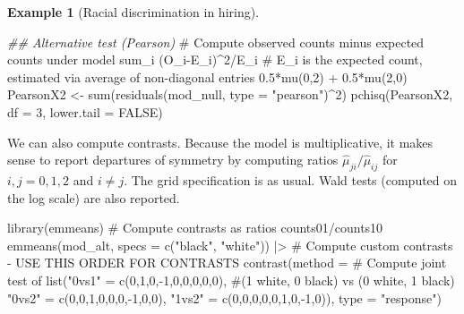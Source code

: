 \documentclass[
  11pt,
  letterpaper,
]{scrbook}
\newenvironment{Shaded}{\begin{snugshade}}{\end{snugshade}}
\newcommand{\AttributeTok}[1]{\textcolor[rgb]{0.40,0.45,0.13}{#1}}
\newcommand{\CommentTok}[1]{\textcolor[rgb]{0.37,0.37,0.37}{#1}}
\newcommand{\ConstantTok}[1]{\textcolor[rgb]{0.56,0.35,0.01}{#1}}
\newcommand{\DecValTok}[1]{\textcolor[rgb]{0.68,0.00,0.00}{#1}}
\newcommand{\DocumentationTok}[1]{\textcolor[rgb]{0.37,0.37,0.37}{\textit{#1}}}
\newcommand{\FunctionTok}[1]{\textcolor[rgb]{0.28,0.35,0.67}{#1}}
\newcommand{\NormalTok}[1]{\textcolor[rgb]{0.00,0.23,0.31}{#1}}
\newcommand{\OtherTok}[1]{\textcolor[rgb]{0.00,0.23,0.31}{#1}}
\newcommand{\SpecialCharTok}[1]{\textcolor[rgb]{0.37,0.37,0.37}{#1}}
\newcommand{\StringTok}[1]{\textcolor[rgb]{0.13,0.47,0.30}{#1}}
\theoremstyle{definition}
\theoremstyle{definition}
\newtheorem{example}{Example}[chapter]
\theoremstyle{remark}
\begin{document}
\begin{example}[Racial discrimination in
hiring]
\begin{Shaded}
\begin{Highlighting}[]
\DocumentationTok{\#\# Alternative test (Pearson)}
\CommentTok{\# Compute observed counts minus expected counts under model sum\_i (O\_i{-}E\_i)\^{}2/E\_i}
\CommentTok{\# E\_i is the expected count, estimated via average of non{-}diagonal entries 0.5*mu(0,2) + 0.5*mu(2,0)}
\NormalTok{PearsonX2 }\OtherTok{\textless{}{-}} \FunctionTok{sum}\NormalTok{(}\FunctionTok{residuals}\NormalTok{(mod\_null, }\AttributeTok{type =} \StringTok{"pearson"}\NormalTok{)}\SpecialCharTok{\^{}}\DecValTok{2}\NormalTok{)}
\FunctionTok{pchisq}\NormalTok{(PearsonX2, }\AttributeTok{df =} \DecValTok{3}\NormalTok{, }\AttributeTok{lower.tail =} \ConstantTok{FALSE}\NormalTok{)}
\end{Highlighting}
\end{Shaded}

We can also compute contrasts. Because the model is multiplicative, it
makes sense to report departures of symmetry by computing ratios
\(\widehat{\mu}_{ji}/\widehat{\mu}_{ij}\) for \(i, j = 0, 1, 2\) and
\(i \neq j\). The grid specification is as usual. Wald tests (computed
on the log scale) are also reported.

\begin{Shaded}
\begin{Highlighting}[]
\FunctionTok{library}\NormalTok{(emmeans)}
\CommentTok{\# Compute contrasts as ratios counts01/counts10}
\FunctionTok{emmeans}\NormalTok{(mod\_alt, }\AttributeTok{specs =} \FunctionTok{c}\NormalTok{(}\StringTok{"black"}\NormalTok{, }\StringTok{"white"}\NormalTok{)) }\SpecialCharTok{|\textgreater{}}
  \CommentTok{\# Compute custom contrasts {-} USE THIS ORDER FOR CONTRASTS}
  \FunctionTok{contrast}\NormalTok{(}\AttributeTok{method =} \CommentTok{\# Compute joint test of}
              \FunctionTok{list}\NormalTok{(}\StringTok{"0vs1"} \OtherTok{=} \FunctionTok{c}\NormalTok{(}\DecValTok{0}\NormalTok{,}\DecValTok{1}\NormalTok{,}\DecValTok{0}\NormalTok{,}\SpecialCharTok{{-}}\DecValTok{1}\NormalTok{,}\DecValTok{0}\NormalTok{,}\DecValTok{0}\NormalTok{,}\DecValTok{0}\NormalTok{,}\DecValTok{0}\NormalTok{,}\DecValTok{0}\NormalTok{), }
                   \CommentTok{\#(1 white, 0 black) vs (0 white, 1 black)}
                   \StringTok{"0vs2"} \OtherTok{=} \FunctionTok{c}\NormalTok{(}\DecValTok{0}\NormalTok{,}\DecValTok{0}\NormalTok{,}\DecValTok{1}\NormalTok{,}\DecValTok{0}\NormalTok{,}\DecValTok{0}\NormalTok{,}\DecValTok{0}\NormalTok{,}\SpecialCharTok{{-}}\DecValTok{1}\NormalTok{,}\DecValTok{0}\NormalTok{,}\DecValTok{0}\NormalTok{),}
                   \StringTok{"1vs2"} \OtherTok{=} \FunctionTok{c}\NormalTok{(}\DecValTok{0}\NormalTok{,}\DecValTok{0}\NormalTok{,}\DecValTok{0}\NormalTok{,}\DecValTok{0}\NormalTok{,}\DecValTok{0}\NormalTok{,}\DecValTok{1}\NormalTok{,}\DecValTok{0}\NormalTok{,}\SpecialCharTok{{-}}\DecValTok{1}\NormalTok{,}\DecValTok{0}\NormalTok{)),}
           \AttributeTok{type =} \StringTok{"response"}\NormalTok{)}
\end{Highlighting}
\end{Shaded}


\end{example}
\end{document}
